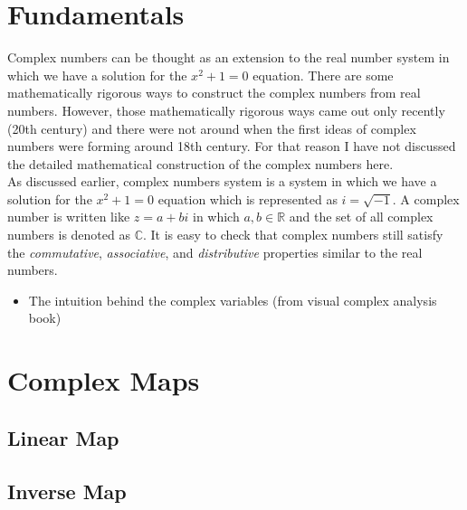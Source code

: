 \section{Fundamentals}

Complex numbers can be thought as an extension to the real number system in which we have a solution for the $x^2 +1 = 0 $ equation. There are some mathematically rigorous ways to construct the complex numbers from real numbers. However, those mathematically rigorous ways came out only recently (20th century) and there were not around when the first ideas of complex numbers were forming around 18th century.  For that reason I have not discussed the detailed mathematical construction of the complex numbers here. \\

As discussed earlier, complex numbers system is a system in which we have a solution for the $x^2+1=0$ equation which is represented as $i = \sqrt{-1}$. A complex number is written like $z = a+bi$ in which $a,b \in \mathbb{R}$ and the set of all complex numbers is denoted as $\mathbb{C}$. It is easy to check that complex numbers still satisfy the \emph{commutative}, \emph{associative}, and \emph{distributive} properties similar to the real numbers. 






\begin{itemize}
\item The intuition behind the complex variables (from visual complex analysis book)


\end{itemize}




\section{Complex Maps}

\subsection{Linear Map}

\subsection{Inverse Map}

